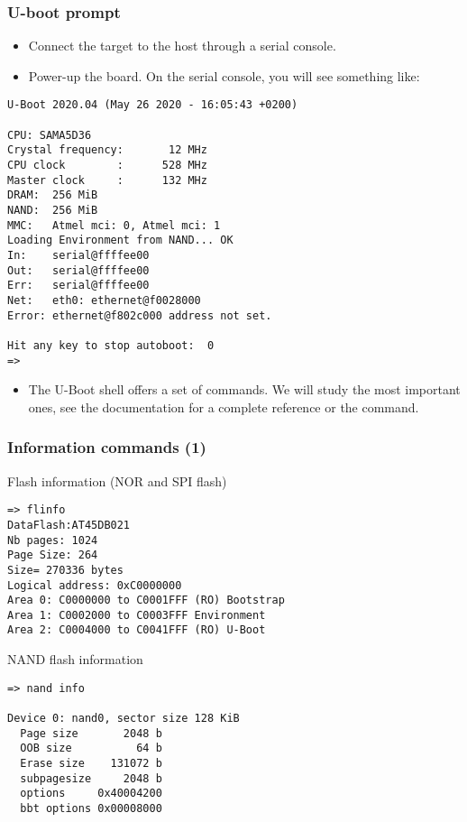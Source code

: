 \begin{frame}[fragile]
  \frametitle{U-boot prompt}
  \begin{itemize}
  \item Connect the target to the host through a serial console.
  \item Power-up the board. On the serial console, you will see
        something like:
  \end{itemize}
\tiny
\begin{verbatim}
U-Boot 2020.04 (May 26 2020 - 16:05:43 +0200)

CPU: SAMA5D36
Crystal frequency:       12 MHz
CPU clock        :      528 MHz
Master clock     :      132 MHz
DRAM:  256 MiB
NAND:  256 MiB
MMC:   Atmel mci: 0, Atmel mci: 1
Loading Environment from NAND... OK
In:    serial@ffffee00
Out:   serial@ffffee00
Err:   serial@ffffee00
Net:   eth0: ethernet@f0028000
Error: ethernet@f802c000 address not set.

Hit any key to stop autoboot:  0
=>
\end{verbatim}
\normalsize
  \begin{itemize}
  \item The U-Boot shell offers a set of commands. We will study the
    most important ones, see the documentation for a complete
    reference or the  command.
  \end{itemize}
\end{frame}

\begin{frame}[fragile]
  \frametitle{Information commands (1)}

\begin{block}{Flash information (NOR and SPI flash)}
{\tiny
\begin{verbatim}
=> flinfo
DataFlash:AT45DB021
Nb pages: 1024
Page Size: 264
Size= 270336 bytes
Logical address: 0xC0000000
Area 0: C0000000 to C0001FFF (RO) Bootstrap
Area 1: C0002000 to C0003FFF Environment
Area 2: C0004000 to C0041FFF (RO) U-Boot
\end{verbatim}}
\end{block}

\begin{block}{NAND flash information}
{\tiny
\begin{verbatim}
=> nand info

Device 0: nand0, sector size 128 KiB
  Page size       2048 b
  OOB size          64 b
  Erase size    131072 b
  subpagesize     2048 b
  options     0x40004200
  bbt options 0x00008000
\end{verbatim}}
\end{block}
\end{frame}

